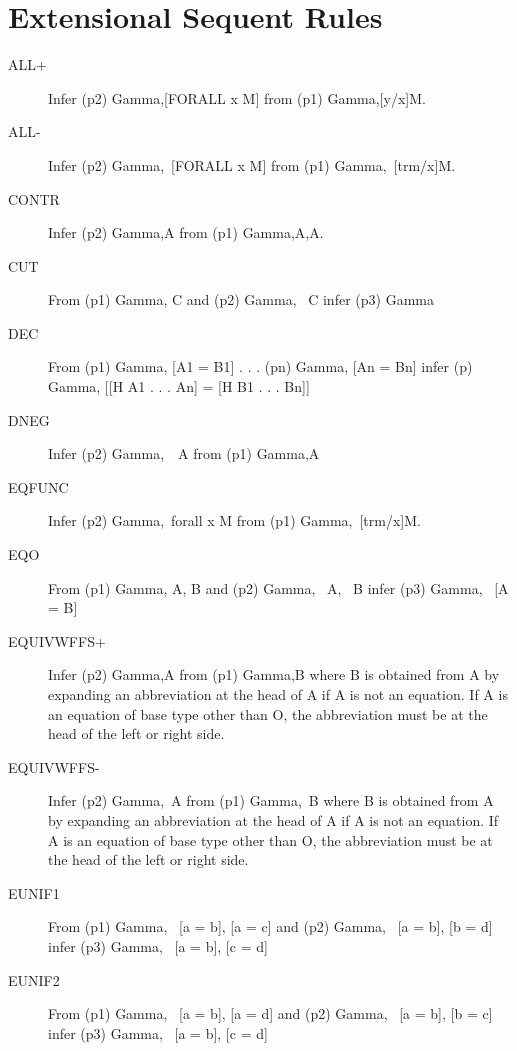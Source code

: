 \section{Extensional Sequent Rules}

\begin{description} 
\item[ALL+]  
Infer (p2) Gamma,[FORALL x M] from (p1) Gamma,[y/x]M.

\item[ALL-]  
Infer (p2) Gamma,~[FORALL x M] from (p1) Gamma,~[trm/x]M.

\item[CONTR]  
Infer (p2) Gamma,A from (p1) Gamma,A,A.

\item[CUT]  
From
(p1) Gamma, C
and
(p2) Gamma, ~C
infer
(p3) Gamma

\item[DEC]  
From
(p1) Gamma, [A1 = B1]
. . .
(pn) Gamma, [An = Bn]
infer
(p) Gamma, [[H A1 . . . An] = [H B1 . . . Bn]]

\item[DNEG]  
Infer (p2) Gamma,~~A from (p1) Gamma,A

\item[EQFUNC]  
Infer (p2) Gamma,~forall x M from (p1) Gamma,~[trm/x]M.

\item[EQO]  
From
(p1) Gamma, A, B
and
(p2) Gamma, ~A, ~B
infer
(p3) Gamma, ~[A = B]

\item[EQUIVWFFS+]  
Infer (p2) Gamma,A from (p1) Gamma,B where B is obtained from A by
expanding an abbreviation at the head of A if A is not an equation.
If A is an equation of base type other than O, the abbreviation must 
be at the head of the left or right side.

\item[EQUIVWFFS-]  
Infer (p2) Gamma,~A from (p1) Gamma,~B where B is obtained from A by
expanding an abbreviation at the head of A if A is not an equation.
If A is an equation of base type other than O, the abbreviation must 
be at the head of the left or right side.

\item[EUNIF1]  
From
(p1) Gamma, ~[a = b], [a = c]
and
(p2) Gamma, ~[a = b], [b = d]
infer
(p3) Gamma, ~[a = b], [c = d]

\item[EUNIF2]  
From
(p1) Gamma, ~[a = b], [a = d]
and
(p2) Gamma, ~[a = b], [b = c]
infer
(p3) Gamma, ~[a = b], [c = d]


\end{description}
